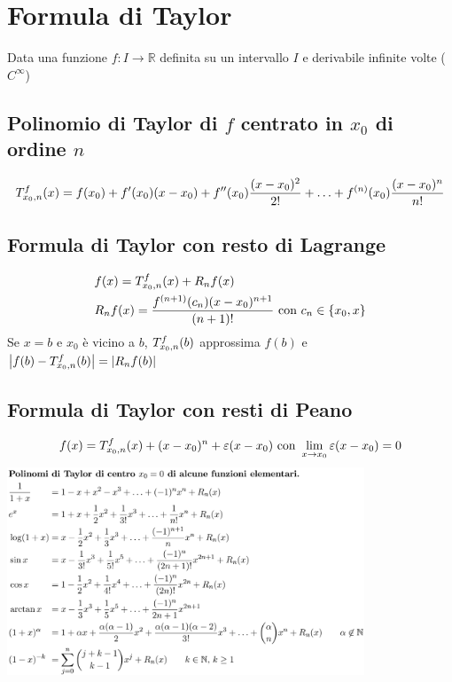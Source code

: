\documentclass[10pt, a4paper]{article}
\begin{document}
\section{Formula di Taylor}
    Data una funzione $f:I\rightarrow\mathbb{R}$ definita su un intervallo $I$ e derivabile infinite volte ($C^{\infty}$)
    \subsection{Polinomio di Taylor di $f$ centrato in $x_0$ di ordine $n$}
        \begin{equation*}
            \taylor{f}{x_0}{n}(x) = f(x_0)+f'(x_0)(x-x_0)+f''(x_0)\frac{(x-x_0)^2}{2!}+\ldots+f^{(n)}(x_0)\frac{(x-x_0)^n}{n!}
        \end{equation*}
    \subsection{Formula di Taylor con resto di Lagrange}
        \begin{equation*}
            \begin{split}
                &f(x) = \taylor{f}{x_0}{n}(x) + R_nf(x)\\
                &R_nf(x) = \frac{f^{(n+1)}(c_n)(x-x_0)^{n+1}}{(n+1)!} \text{ con } c_n\in\{x_0,x\}
            \end{split}
        \end{equation*}
        Se $x=b$ e $x_0$ è vicino a $b$, $\taylor{f}{x_0}{n}(b)$ approssima $f(b)$ e $\left|f(b)-\taylor{f}{x_0}{n}(b)\right| = \left|R_nf(b)\right|$
    \subsection{Formula di Taylor con resti di Peano}
        \begin{equation*}
                f(x)= \taylor{f}{x_0}{n}(x) + (x-x_0)^n + \varepsilon(x-x_0) \text{ con } \lim_{x\rightarrow x_0} \varepsilon(x-x_0) = 0
        \end{equation*}
    \includegraphics[width=0.8\textwidth]{Images/serieditaylor.png}
\newpage
\end{document}

